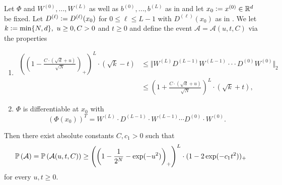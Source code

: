 \begin{proposition} \label{prop:grad_lower}
Let $\Phi$ and $W^{(0)},..., W^{(L)}$ as well as $b^{(0)},..., b^{(L)}$ as in  and let $x_0 \mathrel{\mathop:}= x^{(0)} \in \mathbb{R}^d$ be fixed. Let $D^{(\ell)} \mathrel{\mathop:}= D^{(\ell)}(x_0)$ for $0 \leq \ell \leq L-1$ with $D^{(\ell)}(x_0)$ as in . We let $k \mathrel{\mathop:}= \min  \{N,d\}, \  u \geq 0, C> 0$ and $t \geq 0$ and define the event $\mathcal{A} = \mathcal{A}(u,t,C)$ via the properties 
\begin{enumerate}
\item{\begin{align*}
\left(\left(1 - \frac{C\cdot (\sqrt{d} + u)}{\sqrt{N}}\right)_+\right)^{L} \cdot (\sqrt{k} - t) &\leq\Vert W^{(L)} D^{(L-1)} W^{(L-1)} \cdot \cdot \cdot D^{(0)} W^{(0)} \Vert_2 \\
&\leq \left(1 + \frac{C\cdot(\sqrt{d} + u)}{\sqrt{N}}\right)^{L} \cdot (\sqrt{k} + t),
\end{align*} }
\item{$\Phi$ is differentiable at $x_0$ with 
\begin{equation*}
\left(\Phi(x_0)\right)^T =W^{(L)} \cdot D^{(L-1)} \cdot W^{(L-1)}\cdots D^{(0)} \cdot W^{(0)}.
\end{equation*}}
\end{enumerate}
Then there exist absolute constants $C, c_1 > 0$ such that 
\begin{equation*}
\mathbb{P}\left(\mathcal{A}\right) = \mathbb{P}\left(\mathcal{A}(u,t,C)\right) \geq \left(\left(1 - \frac{1}{2^N}-\exp(-u^2)\right)_+\right)^L \cdot (1- 2 \exp (-c_1 t^2))_+
\end{equation*}
for every $u,t \geq 0$.
\end{proposition}
